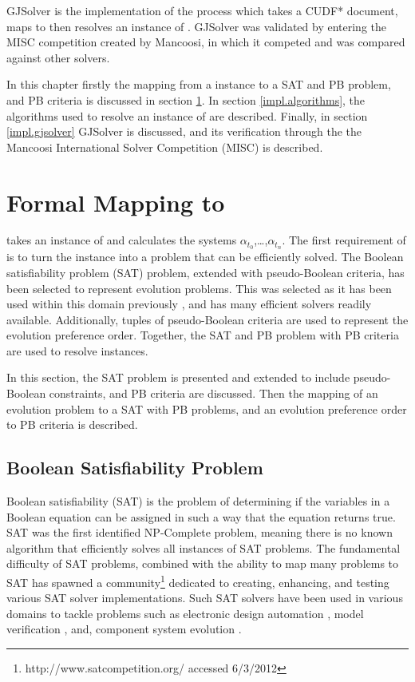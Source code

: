 GJSolver is the implementation of the process which takes a CUDF* document, maps to then resolves an instance of \modelname.
GJSolver was validated by entering the MISC competition created by Mancoosi, in which it competed and was compared against other solvers.

In this chapter firstly the mapping from a \modelname instance to a SAT and PB problem, and PB criteria is discussed in section \ref{impl.mapping}.
In section \ref{impl.algorithms}, the algorithms used to resolve an instance of \modelname are described.
Finally, in section \ref{impl.gjsolver} GJSolver is discussed, and its verification through the the Mancoosi International Solver Competition (MISC) is described.

\section{Formal Mapping to \modelimpl}
\label{impl.mapping}
\modelimpl takes an instance of \modelname and calculates the systems $\alpha_{t_0}$,\ldots,$\alpha_{t_n}$.
The first requirement of \modelimpl is to turn the instance into a problem that can be efficiently solved.
The Boolean satisfiability problem (SAT) problem, extended with pseudo-Boolean criteria, has been selected to represent evolution problems.
This was selected as it has been used within this domain previously \citep{leBerre2010}, and has many efficient solvers readily available.
Additionally, tuples of pseudo-Boolean criteria are used to represent the evolution preference order.
Together, the SAT and PB problem with PB criteria are used to resolve \modelname instances.

In this section, the SAT problem is presented and extended to include pseudo-Boolean constraints, and PB criteria are discussed. 
Then the mapping of an evolution problem to a SAT with PB problems, and an evolution preference order to PB criteria is described. 

\subsection{Boolean Satisfiability Problem}
Boolean satisfiability (SAT) is the problem of determining if the variables in a Boolean equation can be assigned in such a way that the equation returns true.
SAT was the first identified NP-Complete problem, meaning there is no known algorithm that efficiently solves all instances of SAT problems.
The fundamental difficulty of SAT problems, 
combined with the ability to map many problems to SAT has spawned a community\footnote{http://www.satcompetition.org/ accessed 6/3/2012} 
dedicated to creating, enhancing, and testing various SAT solver implementations. 
Such SAT solvers have been used in various domains to tackle problems such as electronic design automation \citep{Marques-Silva2000}, 
model verification \citep{dennis2006}, and, component system evolution \citep{leBerre2010}.

